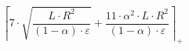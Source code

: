 \[\left\lceil 7 \cdot \sqrt{\frac{L \cdot R^{2}}{\left(1 - \alpha\right) \cdot \varepsilon}} + \frac{11 \cdot \alpha^{2} \cdot L \cdot R^{2}}{\left(1 - \alpha\right) \cdot \varepsilon} \right\rceil_{+}\]
